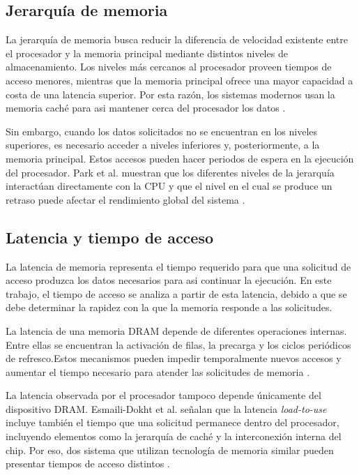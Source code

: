 
\subsection{Jerarquía de memoria}

La jerarquía de memoria busca reducir la diferencia de velocidad existente
entre el procesador y la memoria principal mediante distintos niveles de 
almacenamiento. Los niveles más cercanos al procesador proveen tiempos 
de acceso menores, mientras que la memoria principal ofrece una mayor capacidad
a costa de una latencia superior. Por esta razón, los sistemas modernos 
usan la memoria caché para asi mantener cerca del procesador los datos \cite{son2013reducing}.

Sin embargo, cuando los datos solicitados no se encuentran en los niveles
superiores, es necesario acceder a niveles inferiores y, posteriormente, 
a la memoria principal. Estos accesos pueden hacer periodos de espera en 
la ejecución del procesador. Park et al. muestran que los diferentes niveles 
de la jerarquía interactúan directamente con la CPU y que el nivel en el 
cual se produce un retraso puede afectar el rendimiento global del sistema 
\cite{park2022dvfs}.

\subsection{Latencia y tiempo de acceso}

La latencia de memoria representa el tiempo requerido para que una solicitud 
de acceso produzca los datos necesarios para asi continuar la ejecución.
En este trabajo, el tiempo de acceso se analiza a partir de esta latencia,
debido a que se debe determinar la rapidez con la que la memoria responde
a las solicitudes.

La latencia de una memoria DRAM depende de diferentes operaciones internas.
Entre ellas se encuentran la activación de filas, la precarga y los ciclos
periódicos de refresco.Estos mecanismos pueden impedir temporalmente nuevos 
accesos y aumentar el tiempo necesario para atender las solicitudes de memoria 
\cite{shahbazi2026ddr4}.

La latencia observada por el procesador tampoco depende únicamente del dispositivo
DRAM. Esmaili-Dokht et al. señalan que la latencia \textit{load-to-use} incluye 
también el tiempo que una solicitud permanece dentro del procesador, incluyendo 
elementos como la jerarquía de caché y la interconexión interna del chip. Por eso,
dos sistema que utilizan tecnología de memoria similar pueden presentar tiempos de 
acceso distintos \cite{esmailidokht2024mess}.


